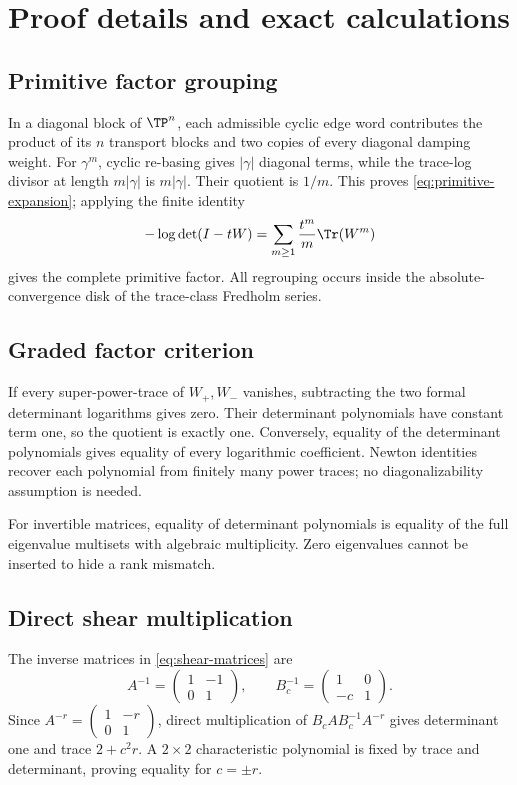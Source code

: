 \section{Proof details and exact calculations}

\subsection{Primitive factor grouping}

In a diagonal block of $\TP^n$, each admissible cyclic edge word contributes
the product of its $n$ transport blocks and two copies of every diagonal
damping weight.  For $\gamma^m$, cyclic re-basing gives $|\gamma|$ diagonal
terms, while the trace-log divisor at length $m|\gamma|$ is $m|\gamma|$.
Their quotient is $1/m$.  This proves \cref{eq:primitive-expansion}; applying
the finite identity
\[
  -\log\det(I-tW)=\sum_{m\ge1}\frac{t^m}{m}\Tr(W^m)
\]
gives the complete primitive factor.  All regrouping occurs inside the
absolute-convergence disk of the trace-class Fredholm series.

\subsection{Graded factor criterion}

If every super-power-trace of $W_+,W_-$ vanishes, subtracting the two formal
determinant logarithms gives zero.  Their determinant polynomials have
constant term one, so the quotient is exactly one.  Conversely, equality of
the determinant polynomials gives equality of every logarithmic coefficient.
Newton identities recover each polynomial from finitely many power traces;
no diagonalizability assumption is needed.

For invertible matrices, equality of determinant polynomials is equality of
the full eigenvalue multisets with algebraic multiplicity.  Zero eigenvalues
cannot be inserted to hide a rank mismatch.

\subsection{Direct shear multiplication}

The inverse matrices in \cref{eq:shear-matrices} are
\[
  A^{-1}=\begin{pmatrix}1&-1\\0&1\end{pmatrix},
  \qquad
  B_c^{-1}=\begin{pmatrix}1&0\\-c&1\end{pmatrix}.
\]
Since $A^{-r}=\left(\begin{smallmatrix}1&-r\\0&1\end{smallmatrix}\right)$,
direct multiplication of $B_cAB_c^{-1}A^{-r}$ gives determinant one and trace
$2+c^2r$.  A $2\times2$ characteristic polynomial is fixed by trace and
determinant, proving equality for $c=\pm r$.

